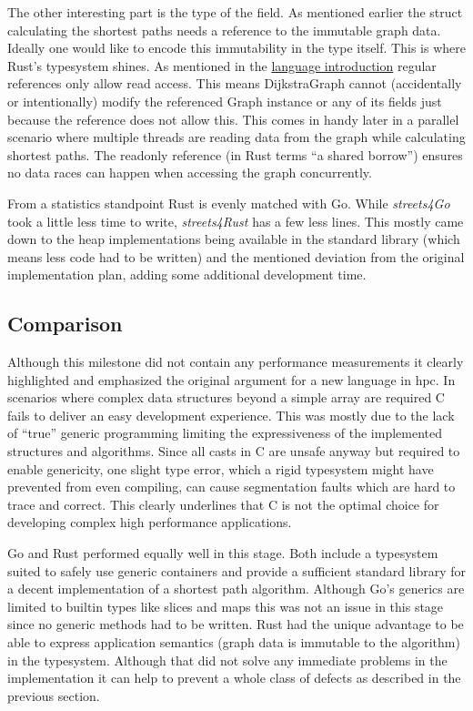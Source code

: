 The other interesting part is the type of the  field. As mentioned earlier the struct calculating the shortest paths needs a reference to the immutable graph data. Ideally one would like to encode this immutability in the type itself. This is where Rust's typesystem shines. As mentioned in the \hyperref[subsec:State_of_the_art::Candidates::Rust]{language introduction} regular references only allow read access. This means DijkstraGraph cannot (accidentally or intentionally) modify the referenced Graph instance or any of its fields just because the reference does not allow this. This comes in handy later in a parallel scenario where multiple threads are reading data from the graph while calculating shortest paths. The readonly reference (in Rust terms ``a shared borrow'') ensures no data races can happen when accessing the graph concurrently.

From a statistics standpoint Rust is evenly matched with Go. While \textit{streets4Go} took a little less time to write, \textit{streets4Rust} has a few less lines. This mostly came down to the heap implementations being available in the standard library (which means less code had to be written) and the mentioned deviation from the original implementation plan, adding some additional development time.

\subsection{Comparison}
\label{subsec:Implementation::Graph_Representation::Comparison}

Although this milestone did not contain any performance measurements it clearly highlighted and emphasized the original argument for a new language in \acrlong{hpc}. In scenarios where complex data structures beyond a simple array are required C fails to deliver an easy development experience. This was mostly due to the lack of ``true'' generic programming limiting the expressiveness of the implemented structures and algorithms. Since all casts in C are unsafe anyway but required to enable genericity, one slight type error, which a rigid typesystem might have prevented from even compiling, can cause segmentation faults which are hard to trace and correct. This clearly underlines that C is not the optimal choice for developing complex high performance applications.

Go and Rust performed equally well in this stage. Both include a typesystem suited to safely use generic containers and provide a sufficient standard library for a decent implementation of a shortest path algorithm. Although Go's generics are limited to builtin types like slices and maps this was not an issue in this stage since no generic methods had to be written. Rust had the unique advantage to be able to express application semantics (graph data is immutable to the algorithm) in the typesystem. Although that did not solve any immediate problems in the implementation it can help to prevent a whole class of defects as described in the previous section.

